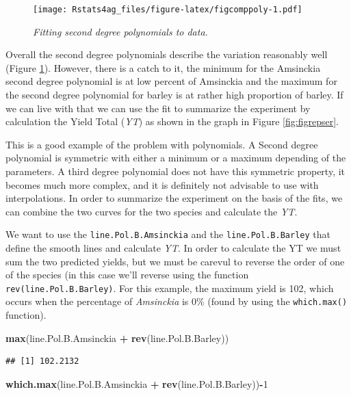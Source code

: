 \documentclass[letterpaper,]{book}
\newenvironment{Shaded}{\begin{snugshade}}{\end{snugshade}}
\newcommand{\DecValTok}[1]{\textcolor[rgb]{0.00,0.00,0.81}{#1}}
\newcommand{\KeywordTok}[1]{\textcolor[rgb]{0.13,0.29,0.53}{\textbf{#1}}}
\newcommand{\NormalTok}[1]{#1}
\newcommand{\OperatorTok}[1]{\textcolor[rgb]{0.81,0.36,0.00}{\textbf{#1}}}
\newcommand{\StringTok}[1]{\textcolor[rgb]{0.31,0.60,0.02}{#1}}
\begin{document}
\begin{figure}
\centering
\texttt{[image: Rstats4ag\_files/figure-latex/figcomppoly-1.pdf]}
\caption{\label{fig:figcomppoly}\emph{Fitting second degree polynomials to data.}}
\end{figure}

Overall the second degree polynomials describe the variation reasonably well (Figure \ref{fig:figcomppoly}). However, there is a catch to it, the minimum for the Amsinckia second degree polynomial is at low percent of Amsinckia and the maximum for the second degree polynomial for barley is at rather high proportion of barley. If we can live with that we can use the fit to summarize the experiment by calculation the Yield Total (\emph{YT}) as shown in the graph in Figure \ref{fig:figrepser}.

This is a good example of the problem with polynomials. A Second degree polynomial is symmetric with either a minimum or a maximum depending of the parameters. A third degree polynomial does not have this symmetric property, it becomes much more complex, and it is definitely not advisable to use with interpolations. In order to summarize the experiment on the basis of the fits, we can combine the two curves for the two species and calculate the \emph{YT}.

We want to use the \texttt{line.Pol.B.Amsinckia} and the \texttt{line.Pol.B.Barley} that define the smooth lines and calculate \emph{YT}. In order to calculate the YT we must sum the two predicted yields, but we must be carevul to reverse the order of one of the species (in this case we'll reverse using the function \texttt{rev(line.Pol.B.Barley)}. For this example, the maximum yield is 102, which occurs when the percentage of \emph{Amsinckia} is 0\% (found by using the \texttt{which.max()} function).



\begin{Shaded}
\begin{Highlighting}[]
\KeywordTok{max}\NormalTok{(line.Pol.B.Amsinckia }\OperatorTok{+}\StringTok{ }\KeywordTok{rev}\NormalTok{(line.Pol.B.Barley))}
\end{Highlighting}
\end{Shaded}

\begin{verbatim}
## [1] 102.2132
\end{verbatim}

\begin{Shaded}
\begin{Highlighting}[]
\KeywordTok{which.max}\NormalTok{(line.Pol.B.Amsinckia }\OperatorTok{+}\StringTok{ }\KeywordTok{rev}\NormalTok{(line.Pol.B.Barley))}\OperatorTok{-}\DecValTok{1}
\end{Highlighting}
\end{Shaded}
\end{document}
